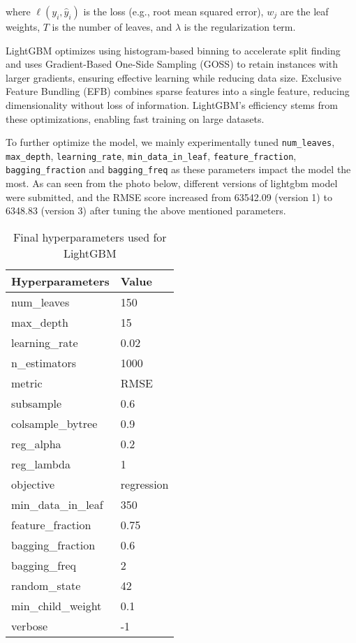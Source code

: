 \documentclass{article}
\begin{document}
where $\ell(y_i, \hat{y}_i)$ is the loss (e.g., root mean squared error), $w_j$ are the leaf weights, $T$ is the number of leaves, and $\lambda$ is the regularization term.

LightGBM optimizes using histogram-based binning to accelerate split finding and uses Gradient-Based One-Side Sampling (GOSS) to retain instances with larger gradients, ensuring effective learning while reducing data size. Exclusive Feature Bundling (EFB) combines sparse features into a single feature, reducing dimensionality without loss of information. LightGBM's efficiency stems from these optimizations, enabling fast training on large datasets.

To further optimize the model, we mainly experimentally tuned \texttt{num\_leaves}, \texttt{max\_depth}, \texttt{learning\_rate}, \texttt{min\_data\_in\_leaf}, \texttt{feature\_fraction}, \texttt{bagging\_fraction} and \texttt{bagging\_freq} as these parameters impact the model the most. As can seen from the photo below, different versions of lightgbm model were submitted, and the RMSE score increased from 63542.09 (version 1) to 6348.83 (version 3) after tuning the above mentioned parameters.

\begin{table}[h]
    \centering
    \caption{Final hyperparameters used for LightGBM}
    \begin{tabular}{ll}
        \hline
        \textbf{Hyperparameters} & \textbf{Value} \\
        \hline
        num\_leaves & 150 \\
        max\_depth & 15 \\
        learning\_rate & 0.02 \\
        n\_estimators & 1000 \\
        metric & RMSE \\
        subsample & 0.6 \\
        colsample\_bytree & 0.9 \\
        reg\_alpha & 0.2 \\
        reg\_lambda & 1 \\
        objective & regression \\
        min\_data\_in\_leaf & 350 \\
        feature\_fraction & 0.75 \\
        bagging\_fraction & 0.6 \\
        bagging\_freq & 2 \\
        random\_state & 42 \\
        min\_child\_weight & 0.1 \\
        verbose & -1 \\
        \hline
    \end{tabular}
\end{table}
\newpage
\end{document}
